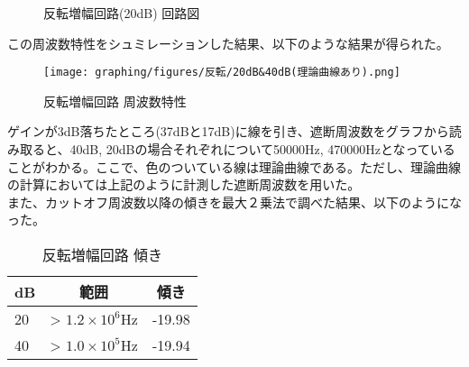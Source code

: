 \documentclass{ltjsarticle}
\begin{document}
\begin{figure}[H]
\begin{center}
        \caption{反転増幅回路(20dB) 回路図}
    \end{center}
\end{figure}

この周波数特性をシュミレーションした結果、以下のような結果が得られた。

\begin{figure}[H]
    \begin{center}
        \texttt{[image: graphing/figures/反転/20dB\&40dB(理論曲線あり).png]}
        \caption{反転増幅回路 周波数特性}
    \end{center}
\end{figure}

ゲインが3dB落ちたところ(37dBと17dB)に線を引き、遮断周波数をグラフから読み取ると、40dB, 20dBの場合それぞれについて50000Hz, 470000Hzとなっていることがわかる。ここで、色のついている線は理論曲線である。ただし、理論曲線の計算においては上記のように計測した遮断周波数を用いた。\\

また、カットオフ周波数以降の傾きを最大２乗法で調べた結果、以下のようになった。

\begin{table}[H]
    \begin{center}
        \begin{tabular}{|l|c|c|} \hline
            dB & 範囲 & 傾き \\ \hline
            20 & > $1.2\times 10^{6}$Hz & -19.98 \\ \hline
            40 & > $1.0 \times 10^5$Hz & -19.94 \\ \hline
        \end{tabular}
        \caption{反転増幅回路 傾き}
    \end{center}
\end{table}
\end{document}
